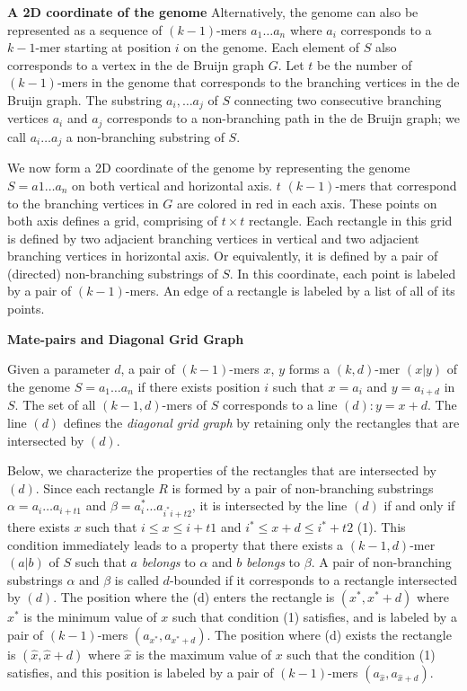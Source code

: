 \documentclass[a4paper]{article}
\begin{document}
\noindent
\textbf{A 2D coordinate of the genome}
Alternatively, the genome can also be represented as a sequence of $(k-1)$-mers $a_1\ldots a_n$ where 
$a_i$ corresponds to a $k-1$-mer starting at position $i$ on the genome. 
Each element of $S$ also corresponds to a vertex in the de Bruijn graph $G$. 
Let $t$ be the number of $(k-1)$-mers in the genome that corresponds to the branching vertices in the
de Bruijn graph. The substring $a_i, \ldots a_j$ of $S$ connecting two consecutive branching 
vertices $a_i$ and $a_j$ corresponds to a non-branching path in the de Bruijn graph; we call 
$a_i\ldots a_j$ a non-branching substring of $S$.

We now form a 2D coordinate of the genome by representing the genome $S=a1\ldots a_n$ on
both vertical and horizontal axis. $t$ $(k-1)$-mers that correspond to the branching vertices 
in $G$ are colored in red in each axis. These points on both axis defines a grid, 
comprising of $t\times t$ rectangle. Each rectangle in this grid is defined by two adjacient branching 
vertices in vertical and two adjacient branching vertices in horizontal axis. 
Or equivalently, it is defined by a pair of (directed) non-branching substrings of $S$.    
In this coordinate, each point is labeled by a pair of $(k-1)$-mers. An edge of a rectangle is labeled 
by a list of all of its points.  

\noindent
\textbf{Mate-pairs and Diagonal Grid Graph}

Given a parameter $d$, a pair of $(k-1)$-mers $x$, $y$ forms a $(k,d)$-mer $(x|y)$  %
of the genome $S = a_1\ldots a_n$ if there exists position $i$ such that $x=a_i$ and 
$y = a_{i+d}$ in $S$. The set of all $(k-1,d)$-mers of $S$ corresponds to a line $(d): y = x+d$.
The line $(d)$ defines the \emph{diagonal grid graph} by retaining only the rectangles that 
are intersected by $(d)$. 

Below, we characterize the properties of the rectangles that are intersected by $(d)$. 
Since each rectangle $R$ is formed by a pair of non-branching substrings $\alpha = a_i\ldots a_{i+t1}$
and $\beta = a_i^*\ldots a_{i^*i+ t2}$, it is intersected by the line $(d)$ if and only if 
there exists $x$ such that $i\leq x \leq i+t1$ and $ i^* \leq x + d \leq i^* + t2$ (1). This condition
immediately leads to a property that there exists a $(k-1,d)$-mer $(a|b)$ of $S$ such that 
$a$ \emph{belongs} to $\alpha$ and $b$ \emph{belongs} to $\beta$.  A pair 
of non-branching substrings $\alpha$ and $\beta$ is called $d$-bounded if it corresponds to 
a rectangle intersected by $(d)$. The position where the (d) enters the rectangle is $(x^*,x^*+d)$ where 
$x^*$ is the minimum value  of $x$ such that condition (1) satisfies, and is labeled by 
a pair of $(k-1)$-mers $(a_{x^*}, a_{x^*+d})$.  The position where (d) exists 
the rectangle is $(\hat{x}, \hat{x}+d)$ where $\hat{x}$ is the maximum value of $x$ such that the condition
(1) satisfies, and this position is labeled by a pair of $(k-1)$-mers $(a_{\hat{x}}, a_{\hat{x} +d})$.
\end{document}
